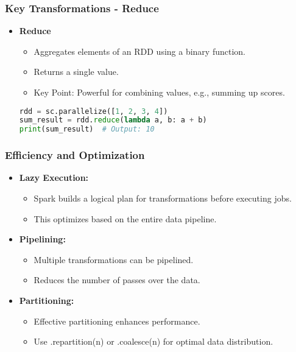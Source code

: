 \documentclass[aspectratio=169]{beamer}
\begin{document}
\begin{frame}[fragile]
    \frametitle{Key Transformations - Reduce}
    \begin{itemize}
        \item \textbf{Reduce}
        \begin{itemize}
            \item Aggregates elements of an RDD using a binary function.
            \item Returns a single value.
            \item Key Point: Powerful for combining values, e.g., summing up scores.
        \end{itemize}
        \begin{lstlisting}[language=python]
rdd = sc.parallelize([1, 2, 3, 4])
sum_result = rdd.reduce(lambda a, b: a + b)
print(sum_result)  # Output: 10
        \end{lstlisting}
    \end{itemize}
\end{frame}

\begin{frame}
    \frametitle{Efficiency and Optimization}
    \begin{itemize}
        \item \textbf{Lazy Execution:} 
            \begin{itemize}
                \item Spark builds a logical plan for transformations before executing jobs.
                \item This optimizes based on the entire data pipeline.
            \end{itemize}
        \item \textbf{Pipelining:}
            \begin{itemize}
                \item Multiple transformations can be pipelined.
                \item Reduces the number of passes over the data.
            \end{itemize}
        \item \textbf{Partitioning:} 
            \begin{itemize}
                \item Effective partitioning enhances performance.
                \item Use .repartition(n) or .coalesce(n) for optimal data distribution.
            \end{itemize}
    \end{itemize}
\end{frame}
\end{document}
